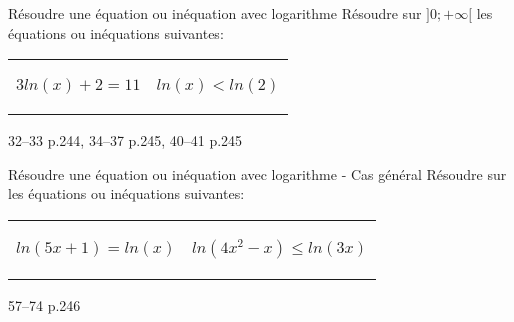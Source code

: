 \documentclass[a4paper]{article}
\begin{document}
\begin{methode}{Résoudre une équation ou inéquation avec logarithme}{}
Résoudre sur $]0;+\infty[$ les équations ou inéquations suivantes:

\begin{tabular}{c|c}
  \begin{minipage}{8cm}
    \begin{center}
      
      $3ln(x)+2=11$
      \vspace{4cm}
    \end{center}
  \end{minipage}&
  \begin{minipage}{8cm}
    \begin{center}
      
  $ln(x)<ln(2)$
      \vspace{4cm}
    \end{center}
  \end{minipage}
\end{tabular}
\end{methode}

  
\begin{exercices}{}{}
  32--33 p.244, 34--37 p.245, 40--41 p.245
  \end{exercices}


\begin{methode}{Résoudre une équation ou inéquation avec logarithme - Cas général}{}
  Résoudre sur les équations ou inéquations suivantes:
  
  \begin{tabular}{c|c}
    \begin{minipage}{8cm}
      \begin{center}
        
        $ln(5x+1)=ln(x)$
        \vspace{10cm}
      \end{center}
    \end{minipage}&
    \begin{minipage}{8cm}
      \begin{center}
        
    $ln(4x^2-x)\leqslant ln(3x)$
        \vspace{10cm}
      \end{center}
    \end{minipage}
  \end{tabular}
  \end{methode}

\begin{exercices}{}{}
57--74 p.246
\end{exercices}
\end{document}
